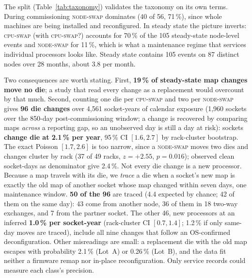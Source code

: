 \documentclass[10pt,conference]{IEEEtran}
\begin{document}
The split (Table~\ref{tab:taxonomy}) validates the taxonomy on its own terms. During commissioning \textsc{node-swap}
dominates (40 of 56, 71\,\%), since whole machines are being installed and reconfigured. In steady state
the picture inverts: \textsc{cpu-swap} (with \textsc{cpu-swap?}) accounts for 70\,\% of the 105
steady-state node-level events and \textsc{node-swap} for 11\,\%, which is what a maintenance regime
that services individual processors looks like. Steady
state contains 105 events on 87 distinct nodes over 28 months, about 3.8 per month.

Two consequences are worth stating. First, \textbf{19\,\% of steady-state map changes move no
die}; a study that read every change as a replacement would overcount by that much. Second,
counting one die per \textsc{cpu-swap} and two per \textsc{node-swap} gives \textbf{96 die
changes} over 4{,}561 socket-years of calendar exposure (1{,}960 sockets over the 850-day
post-commissioning window; a change is recovered by comparing maps \emph{across} a reporting gap,
so an unobserved day is still a day at risk): sockets \textbf{change die at 2.1\,\% per year},
95\,\% CI $[1.6,2.7]$ by rack-cluster bootstrap. The exact Poisson $[1.7,2.6]$ is too narrow,
since a \textsc{node-swap} moves two dies and changes cluster by rack (37 of 49 racks, $z=+2.55$,
$p=0.016$); observed clean socket-days as denominator give 2.4\,\%. Not every die change is a new
processor. Because a map travels with its die, we \emph{trace} a die when a socket's new map is
exactly the old map of another socket whose map changed within seven days, one maintenance
window. \textbf{50 of the 96} are traced (4.4 expected by chance; 42 of them on the same day): 43
come from another node, 36 of them in 18 two-way exchanges, and 7 from the partner socket. The
other 46, new processors at an inferred \textbf{1.0\,\% per socket-year} (rack-cluster CI
$[0.7,1.4]$; 1.2\,\% if only same-day moves are traced), include all nine changes that follow an
OS-confirmed deconfiguration. Other
misreadings are small: a replacement die with the old map escapes with probability 2.1\,\%
(Lot~A) or 0.26\,\% (Lot~B), and the data fit neither a firmware remap nor in-place
reconfiguration. Only service records could measure each class's precision.
\end{document}
